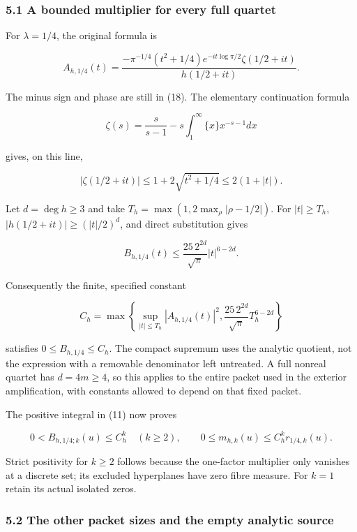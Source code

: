 \subsubsection{5.1 A bounded multiplier for every full
quartet}\label{gamma_convolution:a-bounded-multiplier-for-every-full-quartet}

For \(\lambda=1/4\), the original formula is

\[
A_{h,1/4}(t)=
\frac{-\pi^{-1/4}(t^2+1/4)e^{-it\log\pi/2}\zeta(1/2+it)}{h(1/2+it)}.
                                                                    \tag{20}
\]

The minus sign and phase are still in (18). The elementary continuation formula

\[
\zeta(s)=\frac{s}{s-1}-s\int_1^\infty\{x\}x^{-s-1}dx
\]

gives, on this line,

\[
|\zeta(1/2+it)|\le1+2\sqrt{t^2+1/4}\le2(1+|t|).
\]

Let \(d=\deg h\ge3\) and take \(T_h=\max(1,2\max_\rho|\rho-1/2|)\). For \(|t|\ge T_h\),
\(|h(1/2+it)|\ge(|t|/2)^d\), and direct substitution gives

\[
B_{h,1/4}(t)\le\frac{25\,2^{2d}}{\sqrt\pi}|t|^{6-2d}.
\]

Consequently the finite, specified constant

\[
C_h=\max\left\{
\sup_{|t|\le T_h}|A_{h,1/4}(t)|^2,
\frac{25\,2^{2d}}{\sqrt\pi}T_h^{6-2d}
\right\}
\]

satisfies \(0\le B_{h,1/4}\le C_h\). The compact supremum uses the analytic quotient, not the
expression with a removable denominator left untreated. A full nonreal quartet has \(d=4m\ge4\), so
this applies to the entire packet used in the exterior amplification, with constants allowed to
depend on that fixed packet.

The positive integral in (11) now proves

\[
\boxed{
0<B_{h,1/4;k}(u)\le C_h^k\quad(k\ge2),\qquad
0\le m_{h,k}(u)\le C_h^k r_{1/4,k}(u).
}                                                                   \tag{21}
\]

Strict positivity for \(k\ge2\) follows because the one-factor multiplier only vanishes at a
discrete set; its excluded hyperplanes have zero fibre measure. For \(k=1\) retain its actual
isolated zeros.

\subsubsection{5.2 The other packet sizes and the empty analytic
source}\label{gamma_convolution:the-other-packet-sizes-and-the-empty-analytic-source}

